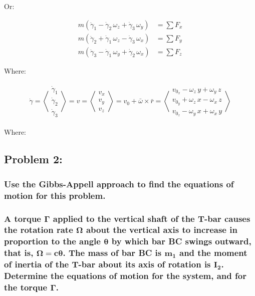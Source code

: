 \documentclass[12pt, letterpaper]{../assignment}
\begin{document}
Or:

\begin{answer}
  \begin{equation*}
    \begin{aligned}
    m\left({\ddot{\gamma} }_1 -{\dot{\gamma} }_2 \,\omega_z +{\dot{\gamma} }_3 \,\omega_y\right) &= \sum F_x \\
    m\left({\ddot{\gamma} }_2 +{\dot{\gamma} }_1 \,\omega_z -{\dot{\gamma} }_3 \,\omega_x\right) &= \sum F_y \\
    m\left({\ddot{\gamma} }_3 -{\dot{\gamma} }_1 \,\omega_y +{\dot{\gamma} }_2 \,\omega_x\right) &= \sum F_z
    \end{aligned}
    \end{equation*}
\end{answer}

Where:

  \begin{equation*}
    \begin{aligned}
      \dot{\gamma} =
      \left<\begin{array}{c} \dot{\gamma}_1 \\ \dot{\gamma}_2 \\ \dot{\gamma}_3  \end{array}\right>
      = v =
      \left<\begin{array}{c} v_x \\ v_y \\ v_z  \end{array}\right>
      = v_0 + \bar{\omega} \times \bar{r}
      = \left<\begin{array}{c}
        v_{0_x} -\omega_z \,y+\omega_y \,z\\
        v_{0_y} +\omega_z \,x-\omega_x \,z\\
        v_{0_z} -\omega_y \,x+\omega_x \,y
        \end{array}\right> 
    \end{aligned}
    \end{equation*}

Where:


\subsection*{Problem 2:}
\subsubsection*{Use the Gibbs-Appell approach to find the equations of motion for this problem.}
\subsubsection*{A torque $\bm{\Gamma}$ applied to the vertical shaft of the T-bar
causes the rotation rate $\bm{\Omega}$ about the vertical axis to increase in proportion to the angle $\bm{\theta}$ by which bar BC swings outward,
that is, $\bm{\Omega = c\theta}$.
The mass of bar BC is $\bm{m_1}$ and the moment of inertia of the T-bar about its axis of rotation is $\bm{I_2}$.
Determine the equations of motion for the system, and for the torque $\bm{\Gamma}$.}
\end{document}
